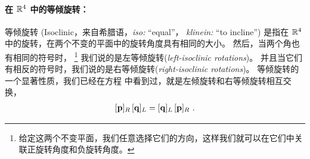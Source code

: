 \paragraph{在 ${\mathbb R}^4$ 中的等倾旋转：} 
%
等倾旋转 (Isoclinic，来自希腊语，\emph{iso:} ``equal''， \emph{klinein:} ``to incline'') 是指在 ${\mathbb R}^4$ 中的旋转，在两个不变的平面中的旋转角度具有相同的大小。
然后，当两个角也有相同的符号时，%
\footnote{给定这两个不变平面，我们任意选择它们的方向，这样我们就可以在它们中关联正旋转角度和负旋转角度。}
我们说的是左等倾旋转(\emph{left-isoclinic rotations})。 
并且当它们有相反的符号时，我们说的是右等倾旋转(\emph{right-isoclinic rotations})。
%
等倾旋转的一个显著性质，我们已经在方程  中看到过，就是左倾旋转和右等倾旋转相互交换，
\begin{align}
 [{\bf p}]_R\,[{\bf q}]_L = [{\bf q}]_L\,[{\bf p}]_R~. \label{equ:isoclinic_commute}
\end{align}

